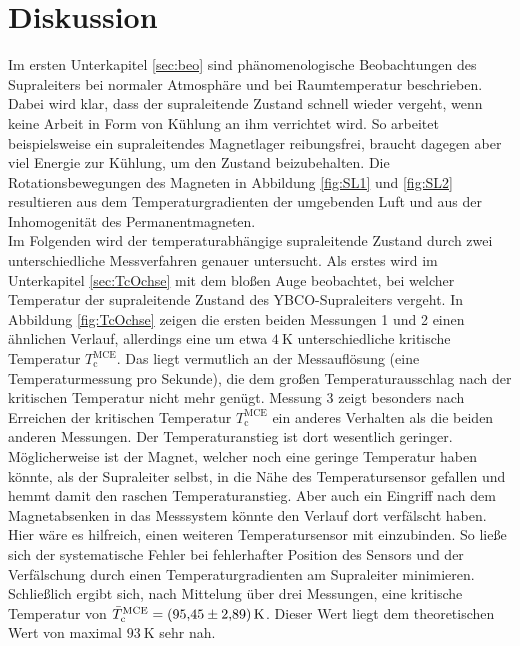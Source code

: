 \section{Diskussion}
\label{sec:Diskussion}

Im ersten Unterkapitel \ref{sec:beo} sind phänomenologische Beobachtungen des Supraleiters
bei normaler Atmosphäre und bei Raumtemperatur
beschrieben. Dabei wird klar, dass der supraleitende Zustand schnell wieder vergeht,
wenn keine Arbeit in Form von Kühlung an ihm verrichtet wird. So arbeitet
beispielsweise ein supraleitendes Magnetlager reibungsfrei, braucht dagegen
aber viel Energie zur Kühlung, um den Zustand beizubehalten. Die Rotationsbewegungen
des Magneten in Abbildung \ref{fig:SL1} und \ref{fig:SL2} resultieren aus dem
Temperaturgradienten der umgebenden Luft und aus der Inhomogenität des Permanentmagneten.\\
Im Folgenden wird der temperaturabhängige supraleitende
Zustand durch zwei unterschied{\-}liche Messverfahren genauer untersucht. Als
erstes wird im Unterkapitel \ref{sec:TcOchse} mit dem bloßen Auge beobachtet,
bei welcher Temperatur der supraleitende Zustand des YBCO-Supraleiters vergeht.
In Abbildung \ref{fig:TcOchse} zeigen die ersten beiden Messungen 1 und 2 einen
ähnlichen Verlauf, allerdings eine um etwa $\SI{4}{\kelvin}$ unterschiedliche
kritische Temperatur $T^{\text{MCE}}_{\text{c}}$.
Das liegt vermutlich an der Messauflösung (eine Temperaturmessung pro Sekunde),
die dem großen Temperaturausschlag nach der kritischen Temperatur nicht mehr genügt.
Messung 3 zeigt besonders nach Erreichen der kritischen Temperatur $T^{\text{MCE}}_{\text{c}}$
ein anderes Verhalten als die beiden anderen Messungen. Der Temperaturanstieg
ist dort wesentlich geringer. Möglicherweise ist der Magnet, welcher noch eine
geringe Temperatur haben könnte, als der Supraleiter selbst, in die Nähe des
Temperatursensor gefallen und hemmt damit den raschen Temperaturanstieg. Aber auch
ein Eingriff nach dem Magnetabsenken in das Messsystem könnte den Verlauf dort
verfälscht haben.
Hier wäre es hilfreich, einen weiteren Temperatursensor mit einzubinden.
So ließe sich der systematische Fehler bei fehlerhafter Position des Sensors und
der Verfälschung durch einen Temperaturgradienten am Supraleiter minimieren.
Schließlich ergibt sich, nach Mittelung über drei Messungen, eine kritische Temperatur
von $\bar{T}^{\text{MCE}}_{\text{c}} = \SI{95.45\pm2.89}{\kelvin}$. Dieser Wert
liegt dem theoretischen Wert von maximal $\SI{93}{\kelvin}$ \cite[S. 62]{Hohenester}
sehr nah. \\
